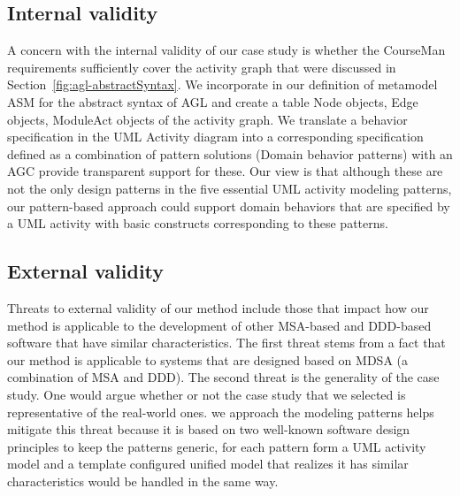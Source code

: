 \subsection{Internal validity}
A concern with the internal validity of our case study is whether the CourseMan requirements sufficiently cover the activity graph that were discussed in Section~\ref{fig:agl-abstractSyntax}. We incorporate in our definition of  metamodel ASM for the abstract syntax of AGL and create a table Node objects, Edge objects, ModuleAct objects of the activity graph.  We translate a behavior specification in the UML Activity diagram into a corresponding specification defined as a combination of pattern solutions (Domain behavior patterns) with an AGC provide transparent support for these. Our view is that although these are not the only design patterns in the five essential UML activity modeling patterns, our pattern-based approach could support domain behaviors that are specified by a UML activity with basic constructs corresponding to these patterns.
%
\subsection{External validity}
Threats to external validity of our method include those that impact how our method is applicable to the development of other MSA-based and DDD-based software that have similar characteristics. The first threat stems from a fact that our method is applicable to systems that are designed based on MDSA (a combination of MSA and DDD). The second threat is the generality of the case study. One would argue whether or not the case study that we selected is representative of the real-world ones.
%
we approach the modeling patterns helps mitigate this threat because it is based on two well-known software design principles to keep the patterns generic, for each pattern form a UML activity model and a template configured unified model that realizes it has similar characteristics would be handled in the same way.
